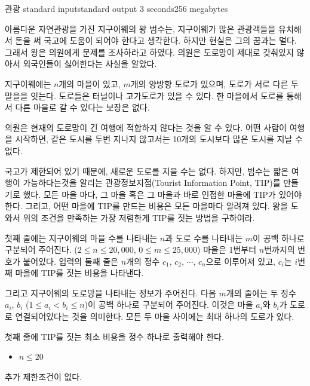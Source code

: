\begin{problem}{관광}
	{standard input}{standard output}
	{3 seconds}{256 megabytes}{}
	
	
	아름다운 자연관광을 가진 지구이웨의 왕 범수는, 지구이웨가 많은 관광객들을 유치해서 돈을 써 국고에 도움이 되어야 한다고 생각한다. 하지만 현실은 그의 꿈과는 멀다. 그래서 왕은 의원에게 문제를 조사하라고 하였다. 의원은 도로망이 제대로 갖춰있지 않아서 외국인들이 싫어한다는 사실을 알았다.
	
	지구이웨에는 $n$개의 마을이 있고, $m$개의 양방향 도로가 있으며, 도로가 서로 다른 두 말을을 잇는다. 도로들은 터널이나 고가도로가 있을 수 있다. 한 마을에서 도로를 통해서 다른 마을로 갈 수 있다는 보장은 없다.
	 
	의원은 현재의 도로망이 긴 여행에 적합하지 않다는 것을 알 수 있다. 어떤 사람이 여행을 시작하면, 같은 도시를 두번 지나지 않고서는 10개의 도시보다 많은 도시를 지날 수 없다.
	
	국고가 제한되어 있기 때문에, 새로운 도로를 지을 수는 없다. 하지만, 범수는 짧은 여행이 가능하다는것을 알리는 관광정보지점(Tourist Information Point, TIP)를 만들기로 했다. 모든 마을 마다, 그 마을 혹은 그 마을과 바로 인접한 마을에 TIP가 있어야 한다. 그리고, 어떤 마을에 TIP를 만드는 비용은 모든 마을마다 알려져 있다. 왕을 도와서 위의 조건을 만족하는 가장 저렴한게 TIP를 짓는 방법을 구하여라.
	
	\InputFile
	
	첫째 줄에는 지구이웨의 마을 수를 나타내는 $n$과 도로 수를 나타내는 $m$이 공백 하나로 구분되어 주어진다. ($2 \le n \le 20,000$, $0 \le m \le 25,000$) 마을은 1번부터 $n$번까지의 번호가 붙어있다. 입력의 둘째 줄은 $n$개의 정수 $c_1$, $c_2$, $\cdots$, $c_n$으로 이루어져 있고, $c_i$는 $i$번째 마을에 TIP를 짓는 비용을 나타낸다. 
	
	그리고 지구이웨의 도로망을 나타내는 정보가 주어진다. 다음 $m$개의 줄에는 두 정수 $a_i$, $b_i$ ($1 \le a_i < b_i \le n$)이 공백 하나로 구분되어 주어진다. 이것은 마을 $a_i$와 $b_i$가 도로로 연결되어있다는 것을 의미한다. 모든 두 마을 사이에는 최대 하나의 도로가 있다.
	
	\OutputFile
	첫째 줄에 TIP를 짓는 최소 비용을 정수 하나로 출력해야 한다.
	
	\begin{itemize}
		\item $n \le 20$
	\end{itemize}
	
	
	추가 제한조건이 없다.
	

\end{problem}
